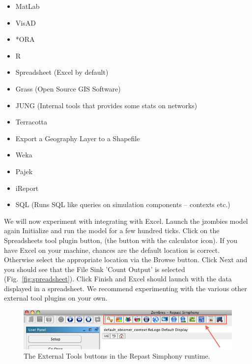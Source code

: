 \documentclass[11pt]{amsart}
\begin{document}
\vspace{.2in}
\begin{itemize}
\item MatLab
\item VisAD
\item *ORA
\item R
\item Spreadsheet (Excel by default)
\item Grass (Open Source GIS Software)
\item JUNG (Internal tools that provides some stats on networks)
\item Terracotta
\item Export a Geography Layer to a Shapefile
\item Weka
\item Pajek
\item iReport
\item SQL (Runs SQL like queries on simulation components -- contexts etc.)
\end{itemize}
\vspace{.2in}

We will now experiment with integrating with Excel. Launch the jzombies model again Initialize and run the model for a few hundred ticks.  Click on the Spreadsheets tool plugin button, (the button with the calculator icon). If you have Excel on your machine, chances are the default location is correct. Otherwise select the appropriate location via the Browse button. Click Next and you should see that the File Sink 'Count Output' is selected (Fig.~\ref{fig:spreadsheet}). Click Finish and Excel should launch with the data displayed in a spreadsheet. We recommend experimenting with the various other external tool plugins on your own.

\begin{figure}
\begin{center}
\vspace{.2in}
\centerline {
\includegraphics[width=5in]{GettingStartedImages/ExternalTools.png}
}
\caption{The External Tools buttons in the Repast Simphony runtime.}
\label{fig:externaltools}
\end{center}
\end{figure}
\end{document}
